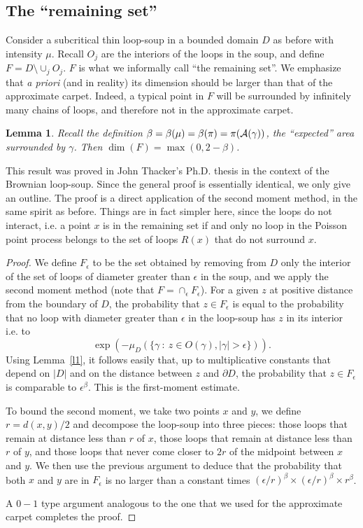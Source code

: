 \documentclass[11pt]{article}
\newtheorem {lemma} [Theorem]    {Lemma}
\newcommand{\eps}{\epsilon}
\begin{document}
\subsection {The ``remaining set''} 

\label {remaining}

Consider a subcritical thin loop-soup in a bounded domain $D$ as before 
with intensity $\mu$. Recall $O_j$ are the interiors of the loops in the soup,
and define $F= D \setminus \cup_j O_j$. 
$F$ is what we informally call ``the remaining set''. 
We emphasize that {\it a priori} (and in reality) its dimension  
should be larger than that of the approximate carpet. Indeed, a typical 
point in $F$ will be surrounded by infinitely many chains of loops,
and therefore not in the approximate carpet.

\begin{lemma}\label{coeff_c}\cite {Th}
Recall the definition $\beta = \beta (\mu)= \beta (\pi) = \pi( {\cal A}(\gamma) )$,
the ``expected'' area surrounded by $\gamma$. Then 
$\dim(F) = \max (0, 2 - \beta)$.
\end{lemma}

This result was proved in John Thacker's Ph.D. thesis \cite {Th} 
in the context of the Brownian loop-soup.
Since the general proof is essentially identical,
we only give an outline. The proof
is a direct application of the second moment method, in the same spirit as before. 
Things are in fact simpler here, since the loops do not interact, i.e. 
a point $x$ is in the remaining set if and only no loop in the 
Poisson point process belongs to the set of loops $R(x)$ that do not surround $x$.

\begin {proof}
We define $F_\eps$ to be the set obtained by removing from $D$ 
only the interior of the set of loops of diameter greater than $\eps$ 
in the soup, and we apply the second moment method 
(note that $F = \cap_\eps F_\eps$). 
For a given $z$ at positive distance from the boundary of $D$, 
the probability that $z \in F_\eps$ is equal to the probability 
that no loop with diameter greater than $\eps$ in the loop-soup has $z$ 
in its interior i.e. to 
$$ \exp ( - \mu_D ( \{ \gamma \ : \ z \in O( \gamma), |\gamma| > \eps \} )).$$
Using Lemma~\ref{l1}, it follows easily
that, up to multiplicative constants that depend on $|D|$ and
on the distance between $z$ and $\partial D$,
the probability that $z \in F_\eps$ is comparable to 
$\eps^{\beta}$. This is the first-moment estimate.

To bound the second moment, we take two points $x$ and $y$, 
we define $r = d (x,y)/2$ and decompose the loop-soup into three pieces: 
those loops that remain at distance less than $r$ of $x$, 
those loops that remain at distance less than $r$ of $y$, 
and those loops that never come closer to $2r$ of the midpoint between $x$ and $y$.
 We then use the previous argument to deduce that the probability 
that both $x$ and $y$ are in $F_\eps$ is no larger than a constant 
times $(\eps/r)^\beta \times (\eps/r)^\beta \times r^\beta$.  

A $0-1$ type argument analogous to the one that we used for the approximate carpet 
completes the proof.
\end {proof}
\end{document}
